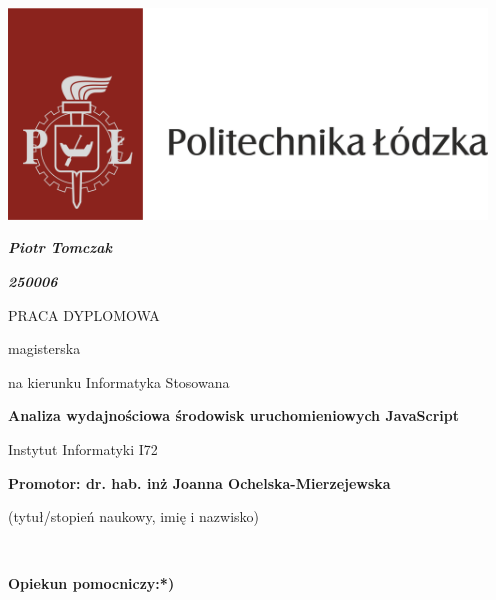 \thispagestyle{empty}

\includegraphics[width=5in]{LogoPL.png}

\begin{centering}

\vspace{1cm}

\textbf{\textit{\large{Piotr Tomczak}}}

\vspace{.1cm}

\textbf{\textit{\large{250006}}}

\vspace{1.5cm}

{\large{PRACA DYPLOMOWA}}

\vspace{.1cm}

{\large{magisterska}}

\vspace{.1cm}

na kierunku Informatyka Stosowana

\vspace{1.8cm}

\textbf{\Large{Analiza wydajnościowa środowisk uruchomieniowych JavaScript}}

\end{centering}

\vspace{3.0cm}
\begin{centering}
{Instytut Informatyki I72}\\
\end{centering}
\vspace{1.0cm}
\textbf{Promotor: dr. hab. inż Joanna Ochelska-Mierzejewska} \dotfill

\begin{centering}
(tytuł/stopień naukowy, imię i nazwisko)

~\\

\end{centering}
\textbf{Opiekun pomocniczy:*)} \dotfill


